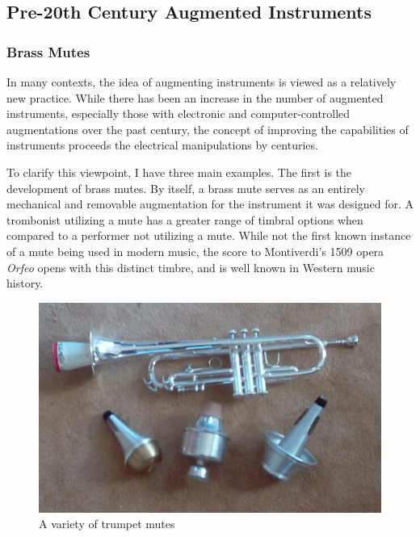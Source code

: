 \subsection{Pre-20th Century Augmented Instruments}

\subsubsection{Brass Mutes}
In many contexts, the idea of augmenting instruments is viewed as a relatively new practice. While there has been an increase in the number of augmented instruments, especially those with electronic and computer-controlled augmentations over the past century, the concept of improving the capabilities of instruments proceeds the electrical manipulations by centuries.

To clarify this viewpoint, I have three main examples. The first is the development of brass mutes. By itself, a brass mute serves as an entirely mechanical and removable augmentation for the instrument it was designed for. A trombonist utilizing a mute has a greater range of timbral options when compared to a performer not utilizing a mute. While not the first known instance of a mute being used in modern music, the score to Montiverdi's 1509 opera \textit{Orfeo} opens with this distinct timbre, and is well known in Western music history.

\begin{figure}
    \centering
    \includegraphics[scale=0.35]{diagrams/TrumpetMutes.jpg}
    \caption{A variety of trumpet mutes} %
    \label{fig:tptmutes}
\end{figure}

